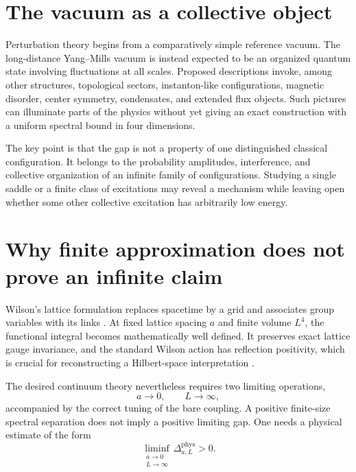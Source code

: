 \documentclass[11pt]{article}
\begin{document}
\section{The vacuum as a collective object}

Perturbation theory begins from a comparatively simple reference vacuum.  The
long-distance Yang--Mills vacuum is instead expected to be an organized quantum
state involving fluctuations at all scales.  Proposed descriptions invoke,
among other structures, topological sectors, instanton-like configurations,
magnetic disorder, center symmetry, condensates, and extended flux objects.
Such pictures can illuminate parts of the physics without yet giving an exact
construction with a uniform spectral bound in four dimensions.

The key point is that the gap is not a property of one distinguished classical
configuration.  It belongs to the probability amplitudes, interference, and
collective organization of an infinite family of configurations.  Studying a
single saddle or a finite class of excitations may reveal a mechanism while
leaving open whether some other collective excitation has arbitrarily low
energy.

\section{Why finite approximation does not prove an infinite claim}

Wilson's lattice formulation replaces spacetime by a grid and associates group
variables with its links \cite{wilson}.  At fixed lattice spacing $a$ and finite
volume $L^{4}$, the functional integral becomes mathematically well defined.
It preserves exact lattice gauge invariance, and the standard Wilson action has
reflection positivity, which is crucial for reconstructing a Hilbert-space
interpretation \cite{jaffe-witten,osterwalder-schrader}.

The desired continuum theory nevertheless requires two limiting operations,
\begin{equation}
  a\longrightarrow0,
  \qquad
  L\longrightarrow\infty,
  \label{eq:limits}
\end{equation}
accompanied by the correct tuning of the bare coupling.  A positive finite-size
spectral separation does not imply a positive limiting gap.  One needs a
physical estimate of the form
\begin{equation}
  \liminf_{\substack{a\to0\\L\to\infty}}
  \Delta^{\mathrm{phys}}_{a,L}>0.
  \label{eq:uniform-gap}
\end{equation}
\end{document}
